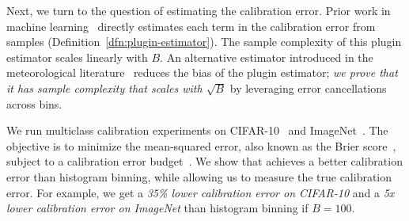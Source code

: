 Next, we turn to the question of estimating the calibration error. Prior work in machine learning~\cite{nguyen2015posterior, guo2017calibration, hendrycks2019anomaly, kuleshov2015calibrated, hendrycks2019pretraining} directly estimates each term  in the calibration error from samples (Definition~\ref{dfn:plugin-estimator}). The sample complexity of this plugin estimator scales linearly with $B$. An alternative estimator introduced in the meteorological literature~\cite{brocker2012empirical, ferro2012bias} reduces the bias of the plugin estimator; \emph{we prove that it has sample complexity that scales with $\sqrt{B}$} by leveraging error cancellations across bins.

We run multiclass calibration experiments on CIFAR-10~\cite{krizhevsky2009learningmultiple} and ImageNet~\cite{deng2009imagenet}.
The objective is to minimize the mean-squared error, also known as the Brier score~\cite{brier1950verification}, subject to a calibration error budget~\cite{gneiting2005weather}.
We show that \ourcal{} achieves a better  calibration error than histogram binning, while allowing us to measure the true calibration error.
For example, we get a \emph{35\% lower calibration error on CIFAR-10} and a \emph{5x lower calibration error on ImageNet} than histogram binning if  $B = 100$.




